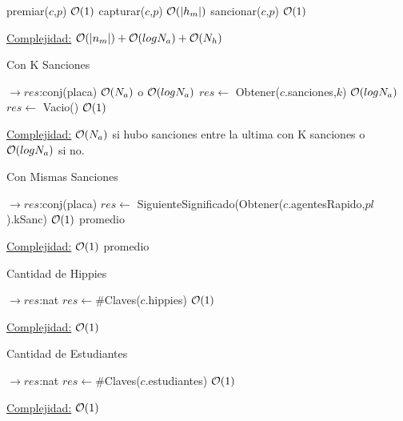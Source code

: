 \begin{Algoritmos}
\begin{algorithm}[H]
\begin{algorithmic}[1]
	\State premiar($c$,$p$) \Comment $\mathcal{O}(1)$
	\State capturar($c$,$p$) \Comment $\mathcal{O}(|h_m|)$
	\State sancionar($c$,$p$) \Comment $\mathcal{O}(1)$
\EndProcedure
\end{algorithmic}
\underline{Complejidad:} $\mathcal{O}(|n_m|) + \mathcal{O}(log N_a) + \mathcal{O}(N_h)$
\end{algorithm}


\begin{algorithm}[H]
\caption{Con K Sanciones}
\begin{algorithmic}[1]
 $\to res$:conj(placa)
	 \Comment $\mathcal{O}(N_a)$ o $\mathcal{O}(log N_a)$
		\State $res \gets$ Obtener($c$.sanciones,$k$) \Comment $\mathcal{O}(log N_a)$
	\Else
		\State $res \gets$ Vacio() \Comment $\mathcal{O}(1)$
	\EndIf
\EndProcedure
\end{algorithmic}
\underline{Complejidad:} $\mathcal{O}(N_a)$ si hubo sanciones entre la ultima con K sanciones o $\mathcal{O}(log N_a)$ si no.
\end{algorithm}

\begin{algorithm}[H]
\caption{Con Mismas Sanciones}
\begin{algorithmic}[1]
 $\to res$:conj(placa)
	\State $res \gets$ SiguienteSignificado(Obtener($c$.agentesRapido,$pl$).kSanc) \Comment $\mathcal{O}(1)$ promedio
\EndProcedure
\end{algorithmic}
\underline{Complejidad:} $\mathcal{O}(1)$ promedio
\end{algorithm}


\begin{algorithm}[H]
\caption{Cantidad de Hippies}
\begin{algorithmic}[1]
 $\to res$:nat
	\State $res \gets \#$Claves($c$.hippies) \Comment $\mathcal{O}(1)$
\EndProcedure
\end{algorithmic}
\underline{Complejidad:} $\mathcal{O}(1)$
\end{algorithm}

\begin{algorithm}[H]
\caption{Cantidad de Estudiantes}
\begin{algorithmic}[1]
 $\to res$:nat
	\State $res \gets \#$Claves($c$.estudiantes) \Comment $\mathcal{O}(1)$
\EndProcedure
\end{algorithmic}
\underline{Complejidad:} $\mathcal{O}(1)$
\end{algorithm}



\end{Algoritmos}
